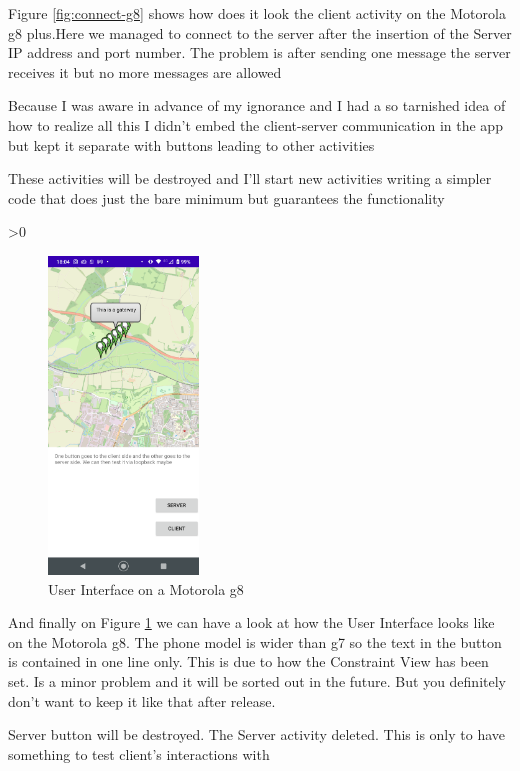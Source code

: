 \documentclass[a4paper,12pt]{book}
\makeatletter
\newcommand{\wrapfill}{\par\ifnum\value{WF@wrappedlines}>0
  \addtocounter{WF@wrappedlines}{-1}%
  \null\vspace{\arabic{WF@wrappedlines}\baselineskip}%
  \WFclear
\fi}
\makeatother
\begin{document}
Figure \ref{fig:connect-g8} shows how does it look the client activity on the Motorola g8 plus.Here we managed to connect to the server after the insertion of the Server IP address and port number. The problem is after sending one message the server receives it but no more messages are allowed

Because I was aware in advance of my ignorance and I had a so tarnished idea of how to realize all this I didn't embed the client-server communication in the app but kept it separate with buttons leading to other activities

These activities will be destroyed and I'll start new activities writing a simpler code that does just the bare minimum but guarantees the functionality
\wrapfill


\clearpage  

\begin{figure}
\centering
\includegraphics[width=4cm]{./current_status_g8.PNG}
\caption{User Interface on a Motorola g8}\label{fig:User-Interface-g8}
\end{figure}






And finally on Figure \ref{fig:User-Interface-g8} we can have a look at how the User Interface looks like on the Motorola g8. The phone model is wider than g7 so the text in the button is contained in one line only. This is due to how the Constraint View has been set. Is a minor problem and it will be sorted out in the future. But you definitely don't want to keep it like that after release.

Server button will be destroyed. The Server activity deleted. This is only to have something to test client's interactions with
\end{document}
